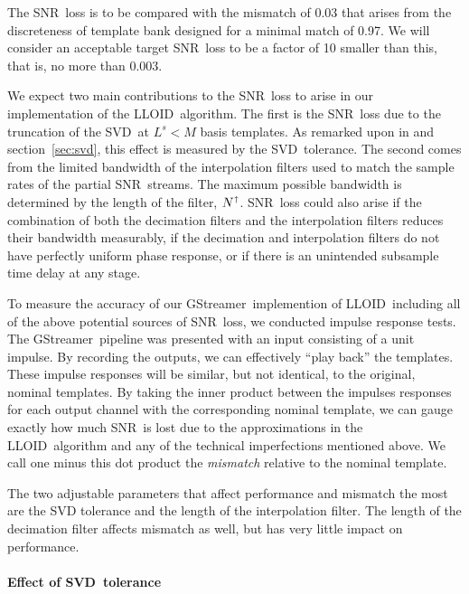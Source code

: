 \documentclass[preprint2]{aastex}
\newcommand{\SNR}{SNR}%
\newcommand{\SVD}{SVD}%
\newcommand{\gstreamer}{GStreamer}
\newcommand{\lloid}{LLOID}%
\begin{document}
The \SNR\ loss is to be compared with the mismatch of 0.03 that arises from the
discreteness of template bank designed for a minimal match of 0.97.  We will consider
an acceptable target \SNR\ loss to be a factor of 10 smaller than this, that is, no more
than 0.003.

We expect two main contributions to the \SNR\ loss to arise in our
implementation of the \lloid\ algorithm.  The first is the \SNR\ loss due to
the truncation of the \SVD\ at $L^s < M$ basis templates.  As remarked upon in
\citet{Cannon:2010p10398} and section~\ref{sec:svd}, this effect is measured by
the \SVD\ tolerance.  The second comes from the limited bandwidth of the
interpolation filters used to match the sample rates of the partial \SNR\ streams.
The maximum possible bandwidth is determined by the length of the filter,
$N^\shortuparrow$.  \SNR\ loss could also arise if the combination of both the
decimation filters and the interpolation filters reduces their bandwidth
measurably, if the decimation and interpolation filters do not have perfectly uniform
phase response, or if there is an unintended subsample time delay at any stage.

To measure the accuracy of our \gstreamer\ implemention of \lloid\ including all of
the above potential sources of \SNR\ loss, we conducted impulse response tests.  The
\gstreamer\ pipeline was presented with an input consisting of a unit impulse.  By
recording the outputs, we can effectively ``play back'' the templates.  These impulse
responses will be similar, but not identical, to the original, nominal templates.
By taking the inner product between the impulses responses for each output 
channel with the corresponding nominal template, we can gauge exactly how much \SNR\
is lost due to the approximations in the \lloid\ algorithm and any of the technical
imperfections mentioned above.  We call one minus this dot product the \emph{mismatch}
relative to the nominal template.

The two adjustable parameters that affect performance and mismatch the most are
the SVD tolerance and the length of the interpolation filter.  The length of the
decimation filter affects mismatch as well, but has very little impact on
performance.

\paragraph{Effect of \SVD\ tolerance}
\end{document}

